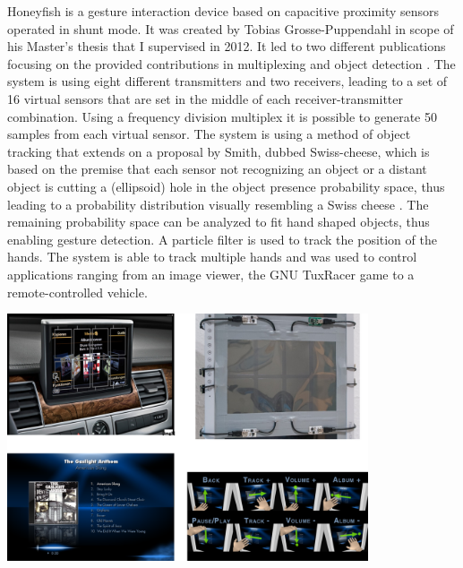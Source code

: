 Honeyfish is a gesture interaction device based on capacitive proximity sensors operated in shunt mode. It was created by Tobias Grosse-Puppendahl in scope of his Master's thesis that I supervised in 2012. It led to two different publications focusing on the provided contributions in multiplexing and object detection \cite{grosse2012honey}\cite{grosse2013swiss}. The system is using eight different transmitters and two receivers, leading to a set of 16 virtual sensors that are set in the middle of each receiver-transmitter combination. Using a frequency division multiplex it is possible to generate 50 samples from each virtual sensor. The system is using a method of object tracking that extends on a proposal by Smith, dubbed Swiss-cheese, which is based on the premise that each sensor not recognizing an object or a distant object is cutting a (ellipsoid) hole in the object presence probability space, thus leading to a probability distribution visually resembling a Swiss cheese \cite{Smith1996a}. The remaining probability space can be analyzed to fit hand shaped objects, thus enabling gesture detection. A particle filter is used to track the position of the hands. The system is able to track multiple hands and was used to control applications ranging from an image viewer, the GNU TuxRacer game to a remote-controlled vehicle.
\begin{minipage}{\linewidth}
\centering
\includegraphics[width=0.8\textwidth]{images/other_proto_gestdisp}
\label{fig:other_proto_gestdisp}
\end{minipage}

